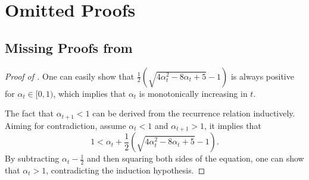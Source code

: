 \documentclass[11pt]{article}
\begin{document}
\section{Omitted Proofs}
\subsection{Missing Proofs from } \label{apx:missingProof} 

\begin{proof}[Proof of ]
    One can easily show that $\frac{1}{2}\left(\sqrt{4\alpha_t^2 - 8\alpha_t + 5} - 1\right)$ is always positive for $\alpha_t \in [0,1)$, which implies that $\alpha_t$ is monotonically increasing in $t$. 

    The fact that $\alpha_{t+1} < 1$ can be  derived from the recurrence relation inductively.
    Aiming for contradiction, assume $\alpha_t < 1$ and  $\alpha_{t+1} > 1$, it implies that
    $$
    1 < \alpha_t + \frac{1}{2}\left(\sqrt{4\alpha_t^2 - 8\alpha_t + 5} - 1\right). 
    $$
    By subtracting $\alpha_t - \frac{1}{2}$ and then squaring  both sides of the equation, one can show that $\alpha_t > 1$, contradicting the induction hypothesis.
\end{proof}
\end{document}
